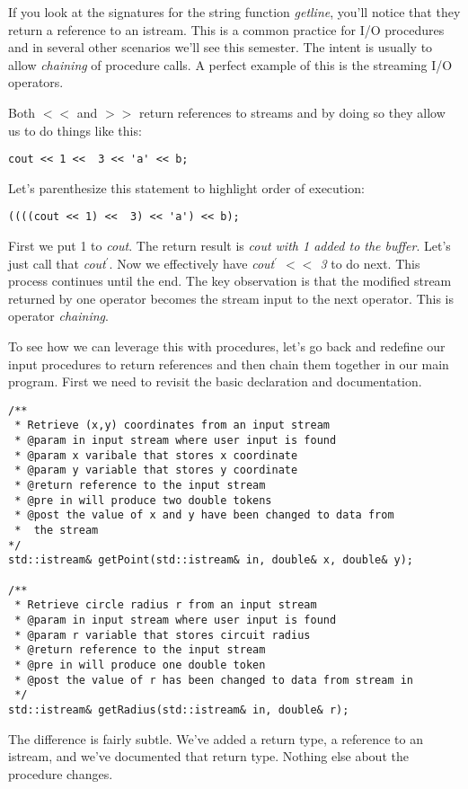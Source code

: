 \documentclass[]{tufte-handout}
\begin{document}
If you look at the signatures for the string function \textit{getline}, you'll notice that they return a reference to an istream. This is a common practice for I/O procedures and in several other scenarios we'll see this semester. The intent is usually to allow \textit{chaining} of procedure calls. A perfect example of this is the streaming I/O operators. 

Both $<<$ and $>>$ return references to streams and by doing so they allow us to do things like this:
\begin{verbatim}
cout << 1 <<  3 << 'a' << b;
\end{verbatim}
Let's parenthesize this statement to highlight order of execution:
\begin{verbatim}
((((cout << 1) <<  3) << 'a') << b);
\end{verbatim}
First we put 1 to \textit{cout}. The return result is \textit{cout with 1 added to the buffer}. Let's just call that \textit{cout$^\prime$}. Now we effectively have \textit{cout$^\prime$ $<<$ 3} to do next. This process continues until the end. The key observation is that the modified stream returned by one operator becomes the stream input to the next operator. This is operator \textit{chaining}. 

To see how we can leverage this with procedures, let's go back and redefine our input procedures to return references and then chain them together in our main program. First we need to revisit the basic declaration and documentation.
\begin{verbatim}
/**
 * Retrieve (x,y) coordinates from an input stream
 * @param in input stream where user input is found
 * @param x varibale that stores x coordinate
 * @param y variable that stores y coordinate
 * @return reference to the input stream
 * @pre in will produce two double tokens
 * @post the value of x and y have been changed to data from
 *  the stream
*/
std::istream& getPoint(std::istream& in, double& x, double& y);

/**
 * Retrieve circle radius r from an input stream
 * @param in input stream where user input is found
 * @param r variable that stores circuit radius
 * @return reference to the input stream
 * @pre in will produce one double token
 * @post the value of r has been changed to data from stream in
 */
std::istream& getRadius(std::istream& in, double& r);
\end{verbatim}
The difference is fairly subtle. We've added a return type, a reference to an istream, and we've documented that return type. Nothing else about the procedure changes. 
\end{document}
